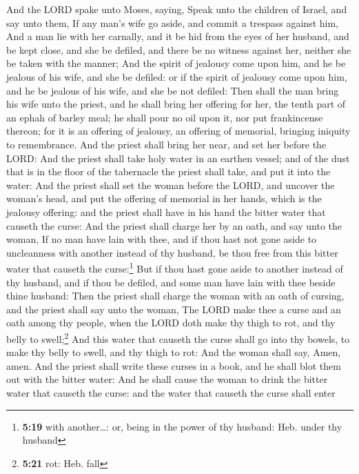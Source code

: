  And the LORD spake unto Moses, saying, 
Speak unto the children of Israel, and say unto them, If any man's wife
go aside, and commit a trespass against him,  And a man
lie with her carnally, and it be hid from the eyes of her husband, and
be kept close, and she be defiled, and there be no witness against her,
neither she be taken with the manner;  And the spirit of
jealousy come upon him, and he be jealous of his wife, and she be
defiled: or if the spirit of jealousy come upon him, and he be jealous
of his wife, and she be not defiled:  Then shall the man
bring his wife unto the priest, and he shall bring her offering for her,
the tenth part of an ephah of barley meal; he shall pour no oil upon it,
nor put frankincense thereon; for it is an offering of jealousy, an
offering of memorial, bringing iniquity to remembrance. 
And the priest shall bring her near, and set her before the LORD:
 And the priest shall take holy water in an earthen
vessel; and of the dust that is in the floor of the tabernacle the
priest shall take, and put it into the water:  And the
priest shall set the woman before the LORD, and uncover the woman's
head, and put the offering of memorial in her hands, which is the
jealousy offering: and the priest shall have in his hand the bitter
water that causeth the curse:  And the priest shall
charge her by an oath, and say unto the woman, If no man have lain with
thee, and if thou hast not gone aside to uncleanness with another
instead of thy husband, be thou free from this bitter water that causeth
the curse:\footnote{\textbf{5:19} with another\ldots: or, being in the
  power of thy husband: Heb. under thy husband}  But if
thou hast gone aside to another instead of thy husband, and if thou be
defiled, and some man have lain with thee beside thine husband:
 Then the priest shall charge the woman with an oath of
cursing, and the priest shall say unto the woman, The LORD make thee a
curse and an oath among thy people, when the LORD doth make thy thigh to
rot, and thy belly to swell;\footnote{\textbf{5:21} rot: Heb. fall}
 And this water that causeth the curse shall go into thy
bowels, to make thy belly to swell, and thy thigh to rot: And the woman
shall say, Amen, amen.  And the priest shall write these
curses in a book, and he shall blot them out with the bitter water:
 And he shall cause the woman to drink the bitter water
that causeth the curse: and the water that causeth the curse shall enter
